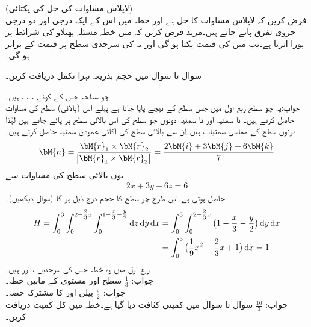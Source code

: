 \quad (لاپلاس مساوات کی حل کی یکتائی)\\
فرض کریں کہ  لاپلاس مساوات کا حل ہے اور خطہ  میں اس کے ایک درجی اور دو درجی جزوی تفرق پائے جاتے ہیں۔مزید فرض کریں کہ  میں خطہ   مسئلہ پھیلاو کی شرائط پر پورا اترتا ہے۔تب  میں  کی قیمت یکتا ہو گی اور یہ  کی سرحدی سطح  پر قیمت کے برابر ہو گی۔

سوال  تا سوال  میں حجم بذریعہ تہرا تکمل دریافت کریں۔

\quad چو سطحہ جس کے کونے ، ، ،  ہیں۔\\
جواب:\quad یہ چو سطح ربع اول میں جس سطح  کے نیچے پایا جاتا ہے پہلے اس (بالائی) سطح کی مساوات حاصل کرتے ہیں۔  تا  سمتیہ  اور  تا  سمتیہ  دونوں جو سطح کی اس بالائی سطح پر پائے جاتے ہیں لہٰذا دونوں سطح کے مماسی سمتیات ہیں۔ان سے بالائی سطح کی اکائی عمودی سمتیہ  حاصل کرتے ہیں۔
\begin{align*}
\bM{n}=\frac{\bM{r}_1\times \bM{r}_2}{\abs{\bM{r}_1\times \bM{r}_2}}=\frac{2\bM{i}+3\bM{j}+6\bM{k}}{7}
\end{align*}
یوں بالائی سطح کی مساوات  سے
\begin{align*}
2x+3y+6z=6
\end{align*}
حاصل ہوتی ہے۔اس طرح چو سطح کا حجم درج ذیل ہو گا (سوال  دیکھیں)۔
\begin{align*}
H=\int_0^3\int_0^{2-\tfrac{2}{3}x}\int_0^{1-\tfrac{x}{3}-\tfrac{y}{2}} \dif z\dif y\dif x&=\int_0^3\int_0^{2-\tfrac{2}{3}x}\big(1-\frac{x}{3}-\frac{y}{2}\big)\dif y\dif x\\
&=\int_0^3 \big(\frac{1}{9}x^2-\frac{2}{3}x+1\big)\dif x=1
\end{align*}
\quad ربع اول میں وہ خطہ جس کی سرحدیں ،  اور  ہیں۔\\
جواب:\quad 
$\tfrac{1}{3}$
\quad سطح  اور  مستوی  کے مابین خطہ۔\\
جواب:\quad 
$\tfrac{\pi}{2}$
\quad بیلن  اور  کا مشترکہ حصہ۔\\
جواب:\quad 
$\tfrac{16}{3}$
سوال  تا سوال  میں کمیتی کثافت  دیا گیا ہے۔خطہ  میں کل کمیت دریافت کریں۔


